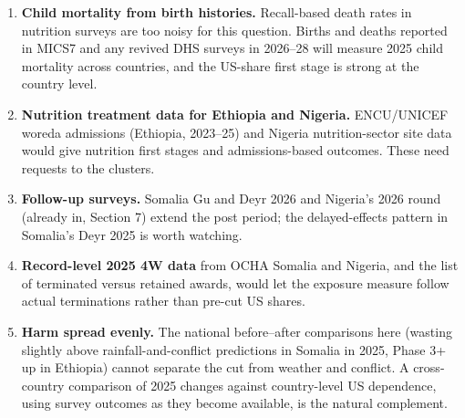 \documentclass[11pt]{article}
\newcommand{\hd}[1]{\par\medskip{\sffamily\large\bfseries\color{navy}#1}\par}
\begin{document}
\hd{10. Possible next steps}
\begin{enumerate}
  \item \textbf{Child mortality from birth histories.} Recall-based death rates in nutrition surveys are too noisy for this question. Births and deaths reported in MICS7 and any revived DHS surveys in 2026--28 will measure 2025 child mortality across countries, and the US-share first stage is strong at the country level.
  \item \textbf{Nutrition treatment data for Ethiopia and Nigeria.} ENCU/UNICEF woreda admissions (Ethiopia, 2023--25) and Nigeria nutrition-sector site data would give nutrition first stages and admissions-based outcomes. These need requests to the clusters.
  \item \textbf{Follow-up surveys.} Somalia Gu and Deyr 2026 and Nigeria's 2026 round (already in, Section 7) extend the post period; the delayed-effects pattern in Somalia's Deyr 2025 is worth watching.
  \item \textbf{Record-level 2025 4W data} from OCHA Somalia and Nigeria, and the list of terminated versus retained awards, would let the exposure measure follow actual terminations rather than pre-cut US shares.
  \item \textbf{Harm spread evenly.} The national before--after comparisons here (wasting slightly above rainfall-and-conflict predictions in Somalia in 2025, Phase 3+ up in Ethiopia) cannot separate the cut from weather and conflict. A cross-country comparison of 2025 changes against country-level US dependence, using survey outcomes as they become available, is the natural complement.
\end{enumerate}
\end{document}
